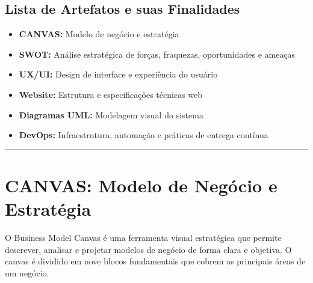 \documentclass[11pt,a4paper]{article}
\begin{document}
\tableofcontents
\newpage

\subsection*{Lista de Artefatos e suas Finalidades}

\begin{itemize}
    \item \textbf{CANVAS:} Modelo de negócio e estratégia
    \item \textbf{SWOT:} Análise estratégica de forças, fraquezas, oportunidades e ameaças
    \item \textbf{UX/UI:} Design de interface e experiência do usuário
    \item \textbf{Website:} Estrutura e especificações técnicas web
    \item \textbf{Diagramas UML:} Modelagem visual do sistema
    \item \textbf{DevOps:} Infraestrutura, automação e práticas de entrega contínua
\end{itemize}

\vspace{0.5cm}
\noindent\rule{\textwidth}{0.5pt}

\newpage

\section{CANVAS: Modelo de Negócio e Estratégia}

O Business Model Canvas é uma ferramenta visual estratégica que permite descrever, analisar e projetar modelos de negócio de forma clara e objetiva. O canvas é dividido em nove blocos fundamentais que cobrem as principais áreas de um negócio.
\end{document}
